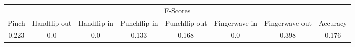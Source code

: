 \documentclass{standalone}
\begin{document}
 
 \begin{tabular}{|c|c|c|c|c|c|c ||c|}
\cline{1-8}\multicolumn{8}{|c|}{F-Scores} \\ 
\cline{1-8}Pinch & Handflip out & Handflip in & Punchflip in & Punchflip out & Fingerwave in & Fingerwave out & Accuracy\\ 
\cline{1-8}0.223 & 0.0 & 0.0 & 0.133 & 0.168 & 0.0 & 0.398 & 0.176\\ 
 \cline{1-8}\hline \end{tabular}
 
\end{document}
